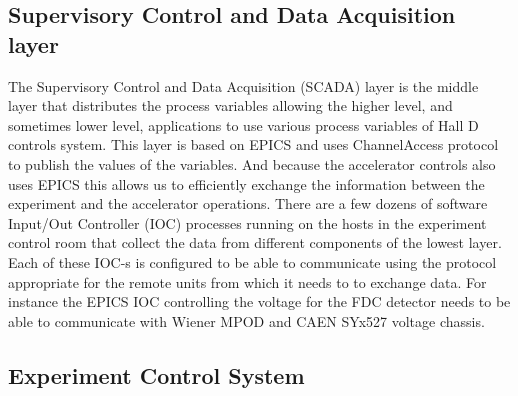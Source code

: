 \subsection{Supervisory Control and Data Acquisition layer \label{sec:archiver}}
The Supervisory Control and Data Acquisition (SCADA) layer is the middle layer that distributes the process variables allowing the higher level, and sometimes lower level, applications to use various process variables of Hall D controls system. This layer is based on EPICS and uses  ChannelAccess protocol to publish the values of the variables. And because the accelerator controls also uses EPICS this allows us to efficiently exchange the information between the experiment and the accelerator operations. There are a few dozens of software Input/Out Controller (IOC) processes running on the hosts in the experiment control room that collect the data from different components of the lowest layer. Each of these IOC-s is configured to be able to communicate using the protocol appropriate for the remote units from which it needs to to exchange data. For instance the EPICS IOC controlling the voltage for the FDC detector needs to be able to communicate with Wiener MPOD and CAEN SYx527 voltage chassis. 
\subsection{Experiment Control System \label{sec:alarms}}
